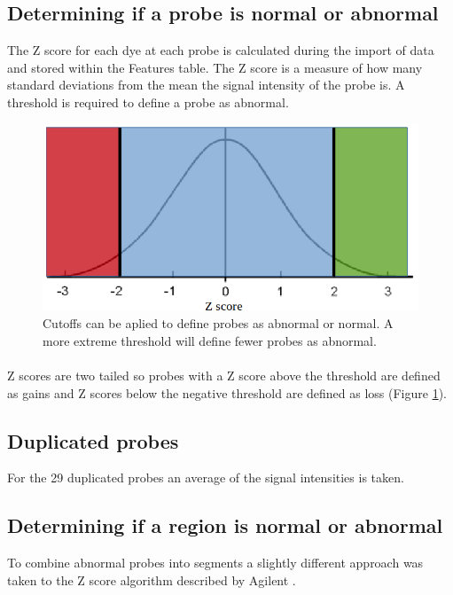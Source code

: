\subsection{Determining if a probe is normal or abnormal}
The Z score for each dye at each probe is calculated during the import of data and stored within the Features table. 
The Z score is a measure of how many standard deviations from the mean the signal intensity of the probe is. A threshold is required to define a probe as abnormal.
\begin{figure}
\centering
\includegraphics[width=1\linewidth]{./Figures/normaldist}
\caption[The normal distribution]{Cutoffs can be aplied to define probes as abnormal or normal. A more extreme threshold will define fewer probes as abnormal.}
\label{fig:normaldist}
\end{figure}

\paragraph*{}
Z scores are two tailed so probes with a Z score above the threshold are defined as gains and Z scores below the negative threshold are defined as loss (Figure \ref{fig:normaldist}).

\subsection{Duplicated probes}
For the 29 duplicated probes an average of the signal intensities is taken.
\subsection{Determining if a region is normal or abnormal}
To combine abnormal probes into segments a slightly different approach was taken to the Z score algorithm described by Agilent \cite{agilent_technologies_agilent_2011}.

